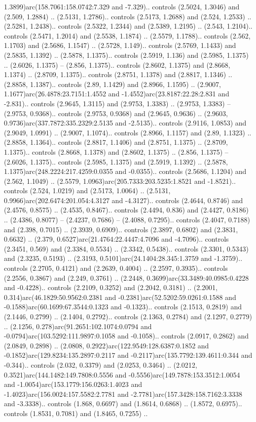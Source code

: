 1.3899)arc(158.7061:158.0742:7.329 and -7.329).. controls (2.5024, 1.3046) and (2.509, 1.2884) .. (2.5131, 1.2786).. controls (2.5173, 1.2688) and (2.524, 1.2533) .. (2.5281, 1.2438).. controls (2.5322, 1.2344) and (2.5389, 1.2195) .. (2.543, 1.2104).. controls (2.5471, 1.2014) and (2.5538, 1.1874) .. (2.5579, 1.1788).. controls (2.562, 1.1703) and (2.5686, 1.1547) .. (2.5728, 1.149).. controls (2.5769, 1.1433) and (2.5835, 1.1392) .. (2.5878, 1.1375).. controls (2.5919, 1.136) and (2.5985, 1.1375) .. (2.6026, 1.1375) -- (2.856, 1.1375).. controls (2.8602, 1.1375) and (2.8668, 1.1374) .. (2.8709, 1.1375).. controls (2.8751, 1.1378) and (2.8817, 1.1346) .. (2.8858, 1.1387).. controls (2.89, 1.1429) and (2.8966, 1.1595) .. (2.9007, 1.1677)arc(26.4878:23.7151:1.4552 and -1.4552)arc(23.8187:22.28:2.831 and -2.831).. controls (2.9645, 1.3115) and (2.9753, 1.3383) .. (2.9753, 1.3383) -- (2.9753, 0.9368).. controls (2.9753, 0.9368) and (2.9645, 0.9636) .. (2.9603, 0.9736)arc(337.7872:335.2329:2.5135 and -2.5135).. controls (2.9116, 1.0853) and (2.9049, 1.0991) .. (2.9007, 1.1074).. controls (2.8966, 1.1157) and (2.89, 1.1323) .. (2.8858, 1.1364).. controls (2.8817, 1.1406) and (2.8751, 1.1375) .. (2.8709, 1.1375).. controls (2.8668, 1.1378) and (2.8602, 1.1375) .. (2.856, 1.1375) -- (2.6026, 1.1375).. controls (2.5985, 1.1375) and (2.5919, 1.1392) .. (2.5878, 1.1375)arc(248.2224:217.4259:0.0355 and -0.0355).. controls (2.5686, 1.1204) and (2.562, 1.1049) .. (2.5579, 1.0963)arc(205.7333:203.5235:1.8521 and -1.8521).. controls (2.524, 1.0219) and (2.5173, 1.0064) .. (2.5131, 0.9966)arc(202.6474:201.054:4.3127 and -4.3127).. controls (2.4644, 0.8746) and (2.4576, 0.8575) .. (2.4535, 0.8467).. controls (2.4494, 0.836) and (2.4427, 0.8186) .. (2.4386, 0.8077) -- (2.4237, 0.7686) -- (2.4088, 0.7295).. controls (2.4047, 0.7188) and (2.398, 0.7015) .. (2.3939, 0.6909).. controls (2.3897, 0.6802) and (2.3831, 0.6632) .. (2.379, 0.6527)arc(21.4764:22.4447:4.7096 and -4.7096).. controls (2.3451, 0.569) and (2.3384, 0.5534) .. (2.3342, 0.5438).. controls (2.3301, 0.5343) and (2.3235, 0.5193) .. (2.3193, 0.5101)arc(24.1404:28.345:1.3759 and -1.3759).. controls (2.2705, 0.4121) and (2.2639, 0.4004) .. (2.2597, 0.3935).. controls (2.2556, 0.3867) and (2.249, 0.3761) .. (2.2448, 0.3699)arc(33.3489:40.0985:0.4228 and -0.4228).. controls (2.2109, 0.3252) and (2.2042, 0.3181) .. (2.2001, 0.314)arc(46.1829:50.9562:0.2381 and -0.2381)arc(52.5202:59.0261:0.1588 and -0.1588)arc(60.1699:67.3544:0.1323 and -0.1323).. controls (2.1513, 0.2819) and (2.1446, 0.2799) .. (2.1404, 0.2792).. controls (2.1363, 0.2784) and (2.1297, 0.2779) .. (2.1256, 0.278)arc(91.2651:102.1074:0.0794 and -0.0794)arc(103.5292:111.9897:0.1058 and -0.1058).. controls (2.0917, 0.2862) and (2.0849, 0.2898) .. (2.0808, 0.2922)arc(122.9549:128.6387:0.1852 and -0.1852)arc(129.8234:135.2897:0.2117 and -0.2117)arc(135.7792:139.4611:0.344 and -0.344).. controls (2.032, 0.3379) and (2.0253, 0.3464) .. (2.0212, 0.3521)arc(144.1482:149.7808:0.5556 and -0.5556)arc(149.7878:153.3512:1.0054 and -1.0054)arc(153.1779:156.0263:1.4023 and -1.4023)arc(156.0024:157.5582:2.7781 and -2.7781)arc(157.3428:158.7162:3.3338 and -3.3338).. controls (1.868, 0.6697) and (1.8614, 0.6868) .. (1.8572, 0.6975).. controls (1.8531, 0.7081) and (1.8465, 0.7255) .. 